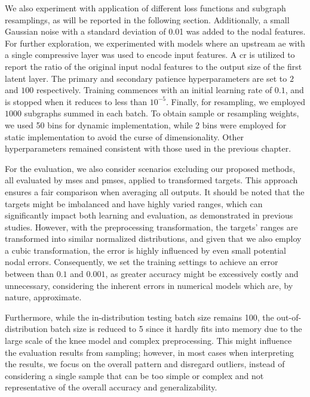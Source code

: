 We also experiment with application of different loss functions and subgraph resamplings, as will be reported in the following section. Additionally, a small Gaussian noise with a standard deviation of 0.01 was added to the nodal features. For further exploration, we experimented with models where an upstream \ac{ae} with a single compressive layer was used to encode input features. A \ac{cr} is utilized to report the ratio of the original input nodal features to the output size of the first latent layer. The primary and secondary patience hyperparameters are set to $2$ and $100$ respectively. Training commences with an initial learning rate of $0.1$, and is stopped when it reduces to less than $10^{-5}$. Finally, for resampling, we employed $1000$ subgraphs summed in each batch. To obtain sample or resampling weights, we used 50 bins for dynamic implementation, while 2 bins were employed for static implementation to avoid the curse of dimensionality. Other hyperparameters remained consistent with those used in the previous chapter.

For the evaluation, we also consider scenarios excluding our proposed methods, all evaluated by \acp{mse} and \acp{pmse}, applied to transformed targets. This approach ensures a fair comparison when averaging all outputs. It should be noted that the targets might be imbalanced and have highly varied ranges, which can significantly impact both learning and evaluation, as demonstrated in previous studies. However, with the preprocessing transformation, the targets' ranges are transformed into similar normalized distributions, and given that we also employ a cubic transformation, the error is highly influenced by even small potential nodal errors. Consequently, we set the training settings to achieve an error between than $0.1$ and $0.001$, as greater accuracy might be excessively costly and unnecessary, considering the inherent errors in numerical models which are, by nature, approximate.

Furthermore, while the in-distribution testing batch size remains 100, the out-of-distribution batch size is reduced to 5 since it hardly fits into memory due to the large scale of the knee model and complex preprocessing. This might influence the evaluation results from sampling; however, in most cases when interpreting the results, we focus on the overall pattern and disregard outliers, instead of considering a single sample that can be too simple or complex and not representative of the overall accuracy and generalizability. 

